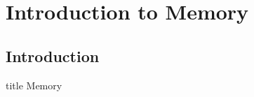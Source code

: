 \documentclass{beamer}
\begin{document}
    \section{Introduction to Memory}
    
    	\subsection{Introduction}
    	
    	\begin{frame}
                \vfill
                \centering
                \begin{beamercolorbox}[sep=8pt,center,shadow=true,rounded=true]{title}
                    Memory\par%
                \end{beamercolorbox}
                \vfill
             \end{frame}
             
   
   		
    
\end{document}
